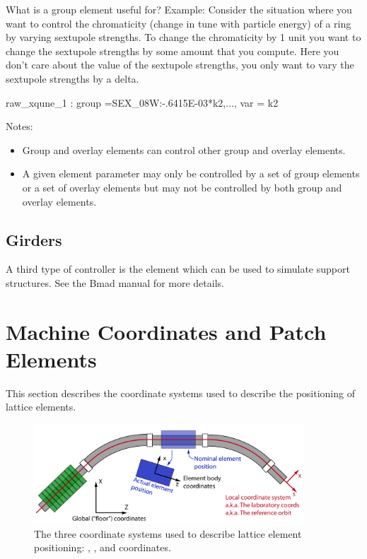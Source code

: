 \documentclass{hitec}
\newcommand{\Section}[1]{\section{#1}\vspace*{-1ex}}
\begin{document}
What is a group element useful for? Example: Consider the situation where you want to control the
chromaticity (change in tune with particle energy) of a ring by varying sextupole strengths. To
change the chromaticity by 1 unit you want to change the sextupole strengths by some amount that you
compute. Here you don't care about the value of the sextupole strengths, you only want to vary the
sextupole strengths by a delta.

\begin{code} 
raw_xqune_1 : group ={SEX_08W:-.6415E-03*k2,...}, var = {k2}
\end{code}

Notes:
\begin{itemize}
\item
Group and overlay elements can control other group and overlay elements.
\item
A given element parameter may only be controlled by a set of group elements or a set of overlay
elements but may not be controlled by both group and overlay elements.
\end{itemize}

\subsection{Girders}

A third type of controller is the  element which can be used to simulate support
structures. See the Bmad manual for more details.

\newpage

\Section{Machine Coordinates and Patch Elements}

This section describes the coordinate systems used to describe the positioning
of lattice elements.

\begin{figure}[tb]
  \centering
  \includegraphics[width=0.9\textwidth]{coordinates.pdf}
  \caption{The three coordinate systems used to describe lattice element positioning:
, , and  coordinates.}
  \label{f:coordinates}
\end{figure}
\end{document}

